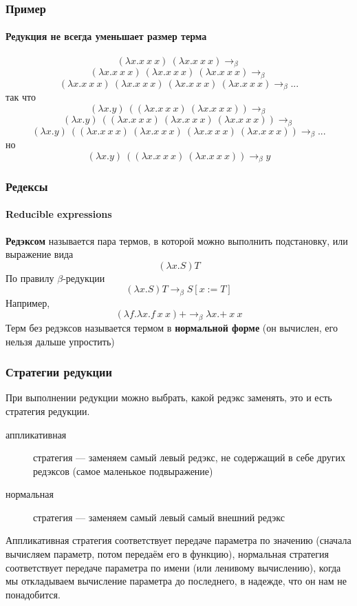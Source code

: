 \documentclass[xetex,mathserif,serif]{beamer}
\begin{document}
	\begin{frame}
		\frametitle{Пример}
		\framesubtitle{Редукция не всегда уменьшает размер терма}
		$$(\lambda x.x\ x\ x)\ (\lambda x.x\ x\ x) \rightarrow_\beta$$ 
		$$(\lambda x.x\ x\ x)\ (\lambda x.x\ x\ x)\ (\lambda x.x\ x\ x) \rightarrow_\beta$$
		$$(\lambda x.x\ x\ x)\ (\lambda x.x\ x\ x)\ (\lambda x.x\ x\ x)\ (\lambda x.x\ x\ x) \rightarrow_\beta ...$$
		так что 
		$$(\lambda x.y)\ ((\lambda x.x\ x\ x)\ (\lambda x.x\ x\ x)) \rightarrow_\beta$$ 
		$$(\lambda x.y)\ ((\lambda x.x\ x\ x)\ (\lambda x.x\ x\ x)\ (\lambda x.x\ x\ x)) \rightarrow_\beta$$
		$$(\lambda x.y)\ ((\lambda x.x\ x\ x)\ (\lambda x.x\ x\ x)\ (\lambda x.x\ x\ x)\ (\lambda x.x\ x\ x)) \rightarrow_\beta ...$$
		но
		$$(\lambda x.y)\ ((\lambda x.x\ x\ x)\ (\lambda x.x\ x\ x)) \rightarrow_\beta y$$		
	\end{frame}
	
	\begin{frame}
		\frametitle{Редексы}
		\framesubtitle{Reducible expressions}
		\textbf{Редэксом} называется пара термов, в которой можно выполнить подстановку, или выражение вида
		$$(\lambda x.S) T$$ 
		По правилу $\beta$-редукции 
		$$(\lambda x.S) T \rightarrow_\beta S[x := T]$$
		Например,
		$$(\lambda f.\lambda x.f\ x\ x) \textbf{+} \rightarrow_\beta \lambda x.\textbf{+}\ x\ x$$
		Терм без редэксов называется термом в \textbf{нормальной форме} (он вычислен, его нельзя дальше упростить)
	\end{frame}

	\begin{frame}
		\frametitle{Стратегии редукции}
		При выполнении редукции можно выбрать, какой редэкс заменять, это и есть стратегия редукции.
		\begin{description}
			\item[аппликативная] стратегия --- заменяем самый левый редэкс, не содержащий в себе других 
					редэксов (самое маленькое подвыражение)
			\item[нормальная] стратегия --- заменяем самый левый самый внешний редэкс
		\end{description}
		Аппликативная стратегия соответствует передаче параметра по значению (сначала вычисляем параметр, потом 
		передаём его в функцию), нормальная стратегия соответствует передаче параметра по имени (или ленивому вычислению),
		когда мы откладываем вычисление параметра до последнего, в надежде, что он нам не понадобится.
	\end{frame}
\end{document}
